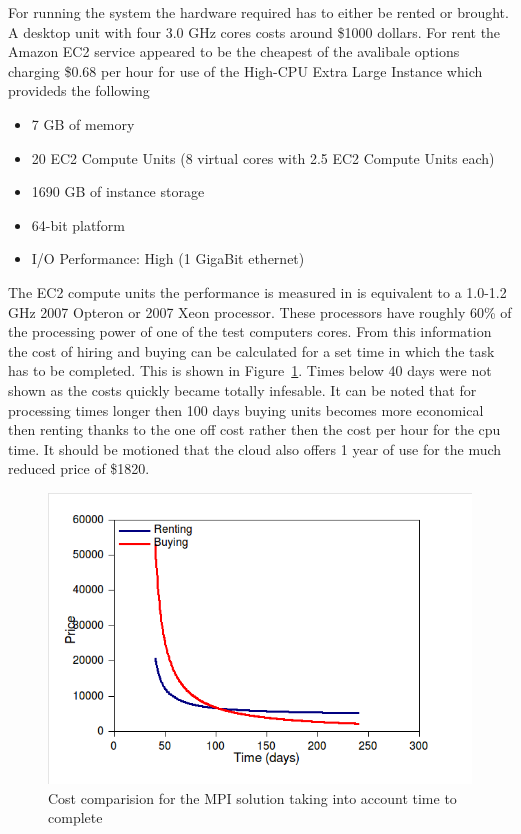 For running the system the hardware required has to either be rented or brought. A desktop unit with four 3.0 GHz cores costs around \$1000 dollars. For rent the Amazon EC2 service appeared to be the cheapest of the avalibale options charging \$0.68 per hour for use of the High-CPU Extra Large Instance which provideds the following 

\begin{itemize}
\item 7 GB of memory
\item 20 EC2 Compute Units (8 virtual cores with 2.5 EC2 Compute Units each)
\item 1690 GB of instance storage
\item 64-bit platform
\item I/O Performance: High (1 GigaBit ethernet)
\end{itemize}

The EC2 compute units the performance is measured in is equivalent to a 1.0-1.2 GHz 2007 Opteron or 2007 Xeon processor. These processors have roughly 60\% of the processing power of one of the test computers cores. From this information the cost of hiring and buying can be calculated for a set time in which the task has to be completed. This is shown in Figure~\ref{mpi-time-money}. Times below 40 days were not shown as the costs quickly became totally infesable. It can be noted that for processing times longer then 100 days buying units becomes more economical then renting thanks to the one off cost rather then the cost per hour for the cpu time. It should be motioned that the cloud also offers 1 year of use for the much reduced price of \$1820.

\begin{figure}[ht]
	\begin{center}
		\includegraphics[width=1.0\textwidth]{mpi-time-money}
	\end{center}
	\caption{Cost comparision for the MPI solution taking into account time to complete}
	\label{mpi-time-money}
\end{figure}

